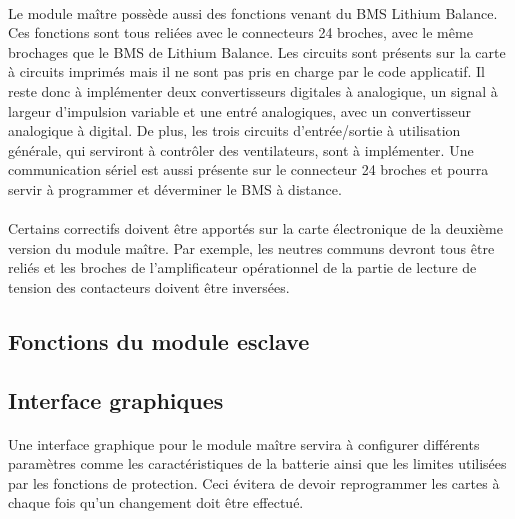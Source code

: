 		\paragraph{}
		Le module maître possède aussi des fonctions venant du BMS Lithium Balance. Ces fonctions sont tous reliées avec le connecteurs 24 broches, avec le même brochages que le BMS de Lithium Balance. Les circuits sont présents sur la carte à circuits imprimés mais il ne sont pas pris en charge par le code applicatif. Il reste donc à implémenter deux convertisseurs digitales à analogique, un signal à largeur d'impulsion variable et une entré analogiques, avec un convertisseur analogique à digital. De plus, les trois circuits d'entrée/sortie à utilisation générale, qui serviront à contrôler des ventilateurs, sont à implémenter. Une communication sériel est aussi présente sur le connecteur 24 broches et pourra servir à programmer et déverminer le BMS à distance.

		\paragraph{}
		Certains correctifs doivent être apportés sur la carte électronique de la deuxième version du module maître. Par exemple, les neutres communs devront tous être reliés et les broches de l'amplificateur opérationnel de la partie de lecture de tension des contacteurs doivent être inversées.

	\subsection{Fonctions du module esclave}

		\paragraph{}


	\subsection{Interface graphiques}
		\paragraph{}
		Une interface graphique pour le module maître servira à configurer différents paramètres comme les caractéristiques de la batterie ainsi que les limites utilisées par les fonctions de protection. Ceci évitera de devoir reprogrammer les cartes à chaque fois qu'un changement doit être effectué.

